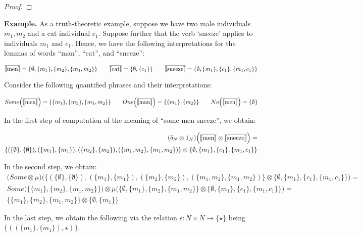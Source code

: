 \begin{proof}
\end{proof}

\bigskip
\noindent
{\bf Example.} As a truth-theoretic  example,  suppose we have two male individuals $m_1, m_2$  and a cat   individual $c_1$.  Suppose further that  the verb `sneeze'  applies to individuals $m_1$ and $c_1$. Hence, we have the following interpretations for the lemmas of words ``man'', ``cat'', and ``sneeze'':

\[
\overline{[\![ \text{men} ]\!]} =  \{\emptyset,  \{m_1\}, \{m_2\}, \{m_1, m_2\}\}  \qquad
\overline{[\![ \text{cat} ]\!]} =  \{\emptyset, \{c_1\}\}  \qquad
\overline{[\![ \text{sneeze} ]\!]} = \{\emptyset, \{m_1\}, \{c_1\}, \{m_1, c_1\}\}
\]

\noindent
Consider the  following quantified phrases and their interpretations:

\[
Some\Big(\overline{[\![ \text{men} ]\!]}\Big) =  \{\{m_1\}, \{m_2\}, \{m_1, m_2\}\} \qquad
One\Big(\overline{[\![ \text{man} ]\!]}\Big) = \{\{m_1\}, \{m_2\}\} \qquad 
No\Big(\overline{[\![ \text{men} ]\!]}\Big) = \{\emptyset\}
\]

\noindent
In the first step of computation of the meaning of  ``some men sneeze'', we obtain:

\begin{align*}
(\delta_N \otimes 1_{N})\Big(\overline{[\![ \text{men} ]\!]} \otimes \overline{[\![ \text{sneeze} ]\!]}\Big) =&\\
  \{(\{\emptyset\}, \{\emptyset\}), (\{m_1\}, \{m_1\}), (\{m_2\}, \{m_2\}), (\{m_1, m_2\}, \{m_1, m_2\}) \} \otimes  \{\emptyset, \{m_1\}, \{c_1\}, \{m_1, c_1\}\} 
\end{align*}

\noindent
In the second step, we obtain:
\begin{align*}
\Big(Some \otimes \mu\Big) \Big ( \{(\{\emptyset\}, \{\emptyset\}), (\{m_1\}, \{m_1\}), (\{m_2\}, \{m_2\}), (\{m_1, m_2\}, \{m_1, m_2\}) \} \otimes  \{\emptyset, \{m_1\}, \{c_1\}, \{m_1, c_1\}\}  \Big) =&\\
Some\Big ( \{\{m_1\}, \{m_2\}, \{m_1, m_2\}\} \Big) \otimes \mu \Big( \{\emptyset, \{m_1\}, \{m_2\}, \{m_1, m_2\}\}  \otimes \{\emptyset, \{m_1\}, \{c_1\}, \{m_1, c_1\}\} \Big)=&\\
\{\{m_1\}, \{m_2\}, \{m_1, m_2\}\}  \otimes \{\emptyset, \{m_1\}\}
\end{align*}

\noindent
In the last step, we obtain the following via the  relation $\epsilon \colon N \times N \to \{\star\}$ being $\{((\{m_1\}, \{m_1\}), \star)\}$:

